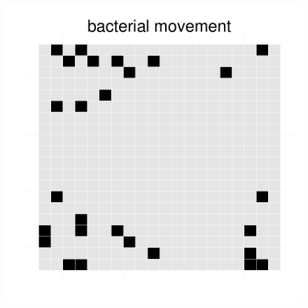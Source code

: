 \begin{figure}[h]
{\begin{minipage}[t]{0.3\textwidth}
  \end{minipage}
  \begin{minipage}[t]{0.3\textwidth}
    \includegraphics[width=\textwidth]{../results/Bcoli_20x20_seed176_bac50.pdf}
  \end{minipage}
  }
\end{figure}
